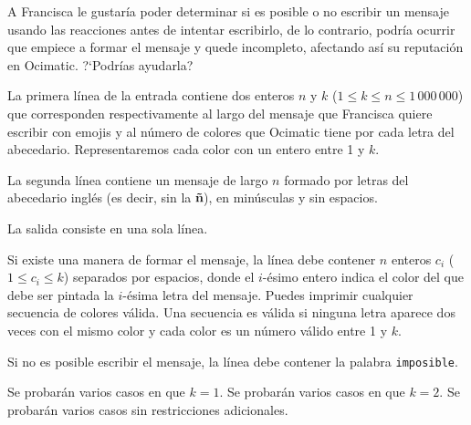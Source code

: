 \documentclass{oci}
\newcommand{\platform}{Ocimatic}
\newcommand{\hero}{Francisca}
\begin{document}
\begin{problemDescription}
A \hero{} le gustaría poder determinar si es posible o no escribir un mensaje
usando las reacciones antes de intentar escribirlo, de lo contrario,
podría ocurrir que empiece a formar el mensaje y quede incompleto, afectando
así su reputación en \platform{}.
%
?`Podrías ayudarla?

\end{problemDescription}

\begin{inputDescription}
La primera línea de la entrada contiene dos enteros $n$ y $k$ ($1 \le k \le n \le 1\,000\,000$)
que corresponden respectivamente al largo del mensaje que \hero{} quiere escribir
con emojis y al número de colores que \platform{} tiene por cada letra del abecedario.
%
Representaremos cada color con un entero entre 1 y $k$.

La segunda línea contiene un mensaje de largo $n$ formado por letras del abecedario
inglés (es decir, sin la \textbf{ñ}), en minúsculas y sin espacios.
\end{inputDescription}

\begin{outputDescription}
La salida consiste en una sola línea.

Si existe una manera de formar el mensaje, la línea debe contener $n$
enteros $c_i$ ($1 \le c_i \le k$) separados por espacios,
donde el $i$-ésimo entero indica el color del que debe ser pintada la $i$-ésima
letra del mensaje.
%
Puedes imprimir cualquier secuencia de colores válida.
%
Una secuencia es válida si ninguna letra aparece dos veces con el
mismo color y cada color es un número válido entre 1 y $k$.

Si no es posible escribir el mensaje, la línea debe contener la palabra \texttt{imposible}.
\end{outputDescription}

\begin{scoreDescription}
  Se probarán varios casos en que $k = 1$.
  Se probarán varios casos en que $k = 2$.
  Se probarán varios casos sin restricciones adicionales.
\end{scoreDescription}

\begin{sampleDescription}
\end{sampleDescription}
\end{document}
